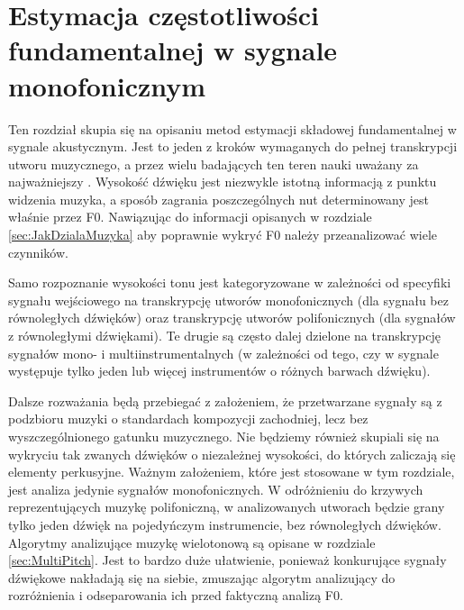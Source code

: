 \documentclass[12pt,a4paper,twoside]{mwart}
\begin{document}
\section{Estymacja częstotliwości fundamentalnej w sygnale monofonicznym}\label{sec:f0}
Ten rozdział skupia się na opisaniu metod estymacji składowej fundamentalnej w sygnale akustycznym. Jest to jeden z kroków wymaganych do pełnej transkrypcji utworu muzycznego, a przez wielu badających ten teren nauki uważany za najważniejszy  \cite[2-4]{Transcription:Klapuri:ChallengesAndFuture}. Wysokość dźwięku jest niezwykle istotną informacją z punktu widzenia muzyka, a sposób zagrania poszczególnych nut determinowany jest właśnie przez F0. Nawiązując do informacji opisanych w rozdziale \ref{sec:JakDzialaMuzyka} aby poprawnie wykryć F0 należy przeanalizować wiele czynników. 

Samo rozpoznanie wysokości tonu jest kategoryzowane w zależności od specyfiki sygnału wejściowego na transkrypcję utworów monofonicznych (dla sygnału bez równoległych dźwięków) oraz transkrypcję utworów polifonicznych (dla sygnałów z równoległymi dźwiękami). Te drugie są często dalej dzielone na transkrypcję sygnałów mono- i multiinstrumentalnych (w zależności od tego, czy w sygnale występuje tylko jeden lub więcej instrumentów o różnych barwach dźwięku).

Dalsze rozważania będą przebiegać z założeniem, że przetwarzane sygnały są z podzbioru muzyki o standardach kompozycji zachodniej, lecz bez wyszczególnionego gatunku muzycznego. Nie będziemy również skupiali się na wykryciu tak zwanych dźwięków o niezależnej wysokości, do których zaliczają się elementy perkusyjne. Ważnym założeniem, które jest stosowane w tym rozdziale, jest analiza jedynie sygnałów monofonicznych. W odróżnieniu do krzywych reprezentujących muzykę polifoniczną, w analizowanych utworach będzie grany tylko jeden dźwięk na pojedyńczym instrumencie, bez równoległych dźwięków. Algorytmy analizujące muzykę wielotonową są opisane w rozdziale \ref{sec:MultiPitch}. Jest to bardzo duże ułatwienie, ponieważ konkurujące sygnały dźwiękowe nakładają się na siebie, zmuszając algorytm analizujący do rozróżnienia i odseparowania ich przed faktyczną analizą F0. 
\end{document}
